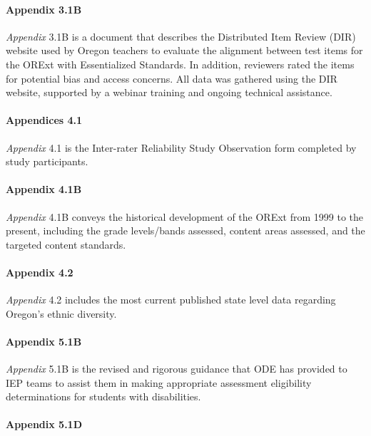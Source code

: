 \documentclass[]{article}
\let\oldparagraph\paragraph
\renewcommand{\paragraph}[1]{\oldparagraph{#1}\mbox{}}
\begin{document}
\paragraph{Appendix 3.1B}\label{appendix-3.1b}

\emph{Appendix} 3.1B is a document that describes the Distributed Item
Review (DIR) website used by Oregon teachers to evaluate the alignment
between test items for the ORExt with Essentialized Standards. In
addition, reviewers rated the items for potential bias and access
concerns. All data was gathered using the DIR website, supported by a
webinar training and ongoing technical assistance.

\paragraph{Appendices 4.1}\label{appendices-4.1}

\emph{Appendix} 4.1 is the Inter-rater Reliability Study Observation
form completed by study participants.

\paragraph{Appendix 4.1B}\label{appendix-4.1b}

\emph{Appendix} 4.1B conveys the historical development of the ORExt
from 1999 to the present, including the grade levels/bands assessed,
content areas assessed, and the targeted content standards.

\paragraph{Appendix 4.2}\label{appendix-4.2}

\emph{Appendix} 4.2 includes the most current published state level data
regarding Oregon's ethnic diversity.

\paragraph{Appendix 5.1B}\label{appendix-5.1b}

\emph{Appendix} 5.1B is the revised and rigorous guidance that ODE has
provided to IEP teams to assist them in making appropriate assessment
eligibility determinations for students with disabilities.

\paragraph{Appendix 5.1D}\label{appendix-5.1d}
\end{document}

